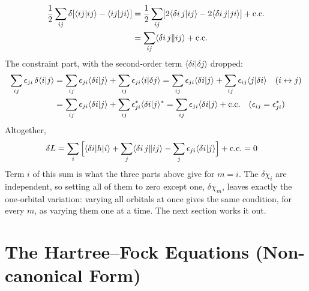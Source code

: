 \begin{align*}
\frac{1}{2} \sum_{ij} \delta [\langle ij\vert ij\rangle - \langle ij\vert ji\rangle] &= \frac{1}{2} \sum_{ij} [2 \langle \delta i\, j\vert ij\rangle - 2 \langle \delta i\, j\vert ji\rangle] + \text{c.c.} \\
&= \sum_{ij} \langle \delta i\, j\Vert ij\rangle + \text{c.c.}
\end{align*}
The constraint part, with the second-order term $\langle \delta i|\delta j\rangle$ dropped:
\begin{align*}
\sum_{ij} \epsilon_{ji}\, \delta \langle i|j\rangle &= \sum_{ij} \epsilon_{ji} \langle \delta i|j\rangle + \sum_{ij} \epsilon_{ji} \langle i|\delta j\rangle = \sum_{ij} \epsilon_{ji} \langle \delta i|j\rangle + \sum_{ij} \epsilon_{ij} \langle j|\delta i\rangle \quad\text{($i \leftrightarrow j$)} \\
&= \sum_{ij} \epsilon_{ji} \langle \delta i|j\rangle + \sum_{ij} \epsilon_{ji}^* \langle \delta i|j\rangle^* = \sum_{ij} \epsilon_{ji} \langle \delta i|j\rangle + \text{c.c.} \quad\text{($\epsilon_{ij} = \epsilon_{ji}^*$)}
\end{align*}
Altogether,
\begin{align*}
\delta L &= \sum_i \Big[ \langle \delta i|h|i\rangle + \sum_j \langle \delta i\, j\Vert ij\rangle - \sum_j \epsilon_{ji} \langle \delta i|j\rangle \Big] + \text{c.c.} = 0
\end{align*}
Term $i$ of this sum is what the three parts above give for $m = i$. The $\delta \chi_i$ are independent, so setting all of them to zero except one, $\delta \chi_m$, leaves exactly the one-orbital variation: varying all orbitals at once gives the same condition, for every $m$, as varying them one at a time. The next section works it out.

\section{The Hartree--Fock Equations (Non-canonical Form)}

